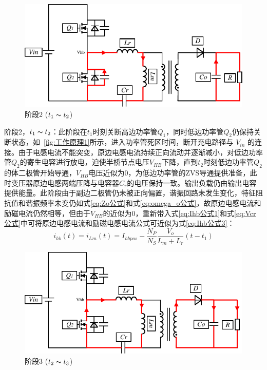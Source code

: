 \begin{figure}[htbp] 
    \centering
    \includegraphics[width=0.6\linewidth]{figures/工作原理2.pdf}
    \caption{阶段2 ($t_1 \thicksim t_2$)}
    \label{fig:工作原理2}
\end{figure}
                
阶段2，$t_1 \thicksim t_2$：此阶段在$t_1$时刻关断高边功率管$Q_1$，同时低边功率管$Q_2$仍保持关断状态，如~\ref{fig:工作原理1}所示，进入功率管死区时间，断开充电路径与 $V_{in}$ 的连接。由于电感电流不能突变，原边电感电流持续正向流动并逐渐减小，对低边功率管$Q_2$的寄生电容进行放电，迫使半桥节点电压$V_{HB}$下降，直到$t_2$时刻低边功率管$Q_2$的体二极管开始导通，$V_{HB}$电压近似为0，为低边功率管的ZVS导通提供准备，此时变压器原边电感两端压降与电容器$C_r$的电压保持一致。输出负载仍由输出电容提供能量。此阶段由于副边二极管仍未被正向偏置，谐振回路未发生变化，特征阻抗值和谐振频率未变仍如式\eqref{eq:Zo公式}和式\eqref{eq:omega_o公式}，故原边电感电流和励磁电流仍然相等，但由于$V_{HB}$的近似为0，重新带入式\eqref{eq:Ihb公式1}和式\eqref{eq:Vcr公式}中可将原边电感电流和励磁电感电流公式可近似为式\eqref{eq:Ihb公式3}：
\begin{equation}
    \label{eq:Ihb公式3}
    i_{hb}(t) = i_{Lm}(t) = I_{hbpos} - \frac{N_P}{N_S} \frac{V_o}{L_m + L_r}(t-t_1)
\end{equation}

                
\begin{figure}[htbp] 
    \centering
    \includegraphics[width=0.6\linewidth]{figures/工作原理3.pdf}
    \caption{阶段3 ($t_2 \thicksim t_3$)}
    \label{fig:工作原理3}
\end{figure}

